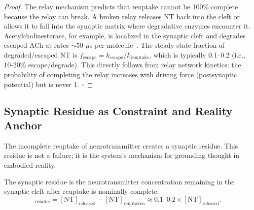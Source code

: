 \begin{proof}
The relay mechanism predicts that reuptake cannot be 100\% complete because the relay can break. A broken relay releases NT back into the cleft or allows it to fall into the synaptic matrix where degradative enzymes encounter it. Acetylcholinesterase, for example, is localized in the synaptic cleft and degrades escaped ACh at rates $\sim 50$ $\mu$s per molecule~\cite{Taylor1991}. The steady-state fraction of degraded/escaped NT is $f_{\text{escape}} = k_{\text{escape}}/k_{\text{reuptake}}$, which is typically 0.1--0.2 (i.e., 10-20\% escape/degrade). This directly follows from relay network kinetics: the probability of completing the relay increases with driving force (postsynaptic potential) but is never 1. $\square$
\end{proof}

\subsection{Synaptic Residue as Constraint and Reality Anchor}
\label{subsec:residue-anchor}

The incomplete reuptake of neurotransmitter creates a synaptic residue. This residue is not a failure; it is the system's mechanism for grounding thought in embodied reality.

\begin{definition}
\label{def:synaptic-residue}
The synaptic residue is the neurotransmitter concentration remaining in the synaptic cleft after reuptake is nominally complete:
\begin{equation}
  [\text{NT}]_{\text{residue}} = [\text{NT}]_{\text{released}} - [\text{NT}]_{\text{reuptaken}} \approx 0.1 \text{--} 0.2 \times [\text{NT}]_{\text{released}}.
\end{equation}
\end{definition}

